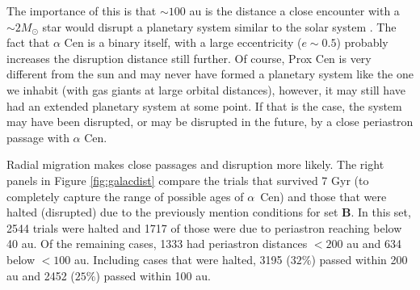 \documentclass[preprint,12pt]{aastex}
\def\acen{{$\alpha$~Cen}}
\begin{document}
The importance of this is that $\sim 100$ au is the distance a close encounter with a 
$\sim 2 M_{\odot}$ star would disrupt a planetary system similar to the solar system
\citep{Kaib13}. The fact that $\alpha$ Cen is a binary itself, with a large eccentricity 
($e \sim 0.5$) probably increases the disruption distance still further.
Of course, Prox Cen is very different from the sun and may never 
have formed a planetary system like the one we inhabit (with gas giants at large 
orbital distances), however, it may still have had an extended planetary system
at some point. If that is the case, the system may have been disrupted, or may be
disrupted in the future, by a close periastron passage with $\alpha$ Cen.

Radial migration makes close passages and disruption more likely. The right 
panels in Figure \ref{fig:galacdist} compare the trials that survived 7 Gyr (to completely 
capture the range of possible ages of \acen)
and those that were halted (disrupted) due to the previously mention conditions 
for set \textbf{B}. In this set, 2544 trials were halted and 1717 of those were 
due to periastron reaching below 40 au. Of the remaining cases, 1333 had 
periastron distances $< 200$ au and 634 below $<100$ au. Including
cases that were halted, 3195 ($32\%$) passed within 200 au and 2452 ($25\%$) 
passed within 100 au.
\end{document}
